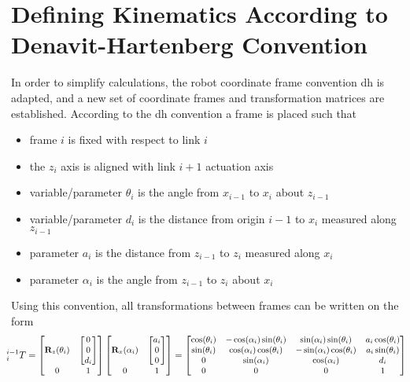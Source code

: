 \section{Defining Kinematics According to Denavit-Hartenberg Convention}\label{sec:denavit_hartenberg}
\vspace{-2mm}
In order to simplify calculations, the robot coordinate frame convention \gls{dh} is adapted, and a new set of coordinate frames and transformation matrices are established. According to the \gls{dh} convention a frame is placed such that
\begin{itemize}
\itemsep-1.3mm 
\item frame $i$ is fixed with respect to link $i$
\item the $z_i$ axis is aligned with link $i+1$ actuation axis
\item variable/parameter $\theta_i$ is the angle from $x_{i-1}$ to $x_i$ about $z_{i-1}$
\item variable/parameter $d_i$ is the distance from origin $i-1$ to $x_i$ measured along $z_{i-1}$
\item parameter $a_i$ is the distance from $z_{i-1}$ to $z_i$ measured along $x_i$
\item parameter $\alpha_i$ is the angle from $z_{i-1}$ to $z_i$ about $x_i$
\end{itemize}

Using this convention, all transformations between frames can be written on the form
\begin{equation}
\hspace*{-2mm}
\small
^{i-1}_i T = %
\begin{bmatrix}
\textbf{R}_z(\theta_i) & \begin{bmatrix}0\\ 0\\ d_i\end{bmatrix}\\
0 & 1
\end{bmatrix}
\begin{bmatrix}
\textbf{R}_x(\alpha_i) & \begin{bmatrix}a_i\\ 0\\ 0\end{bmatrix}\\
0 & 1
\end{bmatrix}
=
\begin{bmatrix}
\cos(\theta_i) & -\cos(\alpha_i)\sin(\theta_i) & \sin(\alpha_i)\sin(\theta_i) & a_i \cos(\theta_i)\\
\sin(\theta_i) & \cos(\alpha_i)\cos(\theta_i) & -\sin(\alpha_i)\cos(\theta_i) & a_i \sin(\theta_i)\\
0 & \sin(\alpha_i) & \cos(\alpha_i) & d_i\\
0 & 0 & 0 & 1
\end{bmatrix}
\end{equation}

